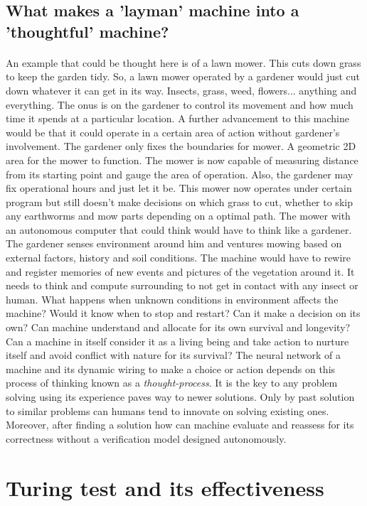 \documentclass[]{article}
\begin{document}
\subsection{What makes a 'layman' machine into a 'thoughtful' machine?}
\paragraph{}
An example that could be thought here is of a lawn mower. This cuts down grass to keep the garden tidy. So, a 
lawn mower operated by a gardener would just cut down whatever it can get in its way. Insects, grass, weed, flowers...
anything and everything. The onus is on the gardener to control its movement and how much time it spends at a particular
location. A further advancement to this machine would be that it could operate in a certain area of action without gardener's
involvement. The gardener only fixes the boundaries for mower. A geometric 2D area for the mower to function.
The mower is now capable of measuring distance from its starting point and gauge the area of operation. Also, the gardener may
fix operational hours and just let it be. This mower now operates under certain program but still doesn't make decisions on which
grass to cut, whether to skip any earthworms and mow parts depending on a optimal path. The mower with an autonomous computer
that could think would have to think like a gardener. The gardener senses environment around him and ventures mowing based on external
factors, history and soil conditions. The machine would have to rewire and register memories of new events and pictures of the
vegetation around it. It needs to think and compute surrounding to not get in contact with any insect or human. What happens when unknown
conditions in environment affects the machine? Would it know when to stop and restart? Can it make a decision on its own? Can machine
understand and allocate for its own survival and longevity? Can a machine in itself consider it as a living being and take action to 
nurture itself and avoid conflict with nature for its survival? The neural network of a machine and its dynamic wiring to make a choice
or action depends on this process of thinking known as a \textit{thought-process}. It is the key to any problem solving using its 
experience paves way to newer solutions. Only by past solution to similar problems can humans tend to innovate on solving existing ones.
Moreover, after finding a solution how can machine evaluate and reassess for its correctness without a verification model designed autonomously.
\section{Turing test and its effectiveness}
\end{document}

